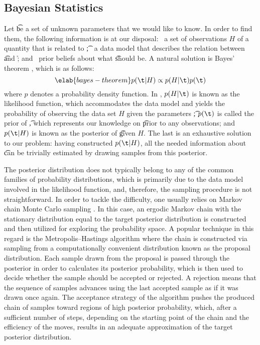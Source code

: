 \subsection{Bayesian Statistics}

Let \t be a set of unknown parameters that we would like to know. In order to
find them, the following information is at our disposal: \one~a set of
observations $H$ of a quantity \h that is related to \t; \two~a data model that
describes the relation between \t and \h; and \three~prior beliefs about what \t
should be. A natural solution is Bayes' theorem \cite{gelman2004}, which is as
follows:
\begin{equation} \elab{bayes-theorem}
  p(\t | H) \propto p(H | \t) p(\t)
\end{equation}
where $p$ denotes a probability density function. In , $p(H
| \t)$ is known as the likelihood function, which accommodates the data model
and yields the probability of observing the data set $H$ given the parameters
\t; $p(\t)$ is called the prior of \t, which represents our knowledge on \t
prior to any observations; and $p(\t | H)$ is known as the posterior of \t given
$H$. The last is an exhaustive solution to our problem: having constructed $p(\t
| H)$, all the needed information about \t can be trivially estimated by drawing
samples from this posterior.

The posterior distribution does not typically belong to any of the common
families of probability distributions, which is primarily due to the data model
involved in the likelihood function, and, therefore, the sampling procedure is
not straightforward. In order to tackle the difficulty, one usually relies on
Markov chain Monte Carlo sampling \cite{gelman2004}. In this case, an ergodic
Markov chain with the stationary distribution equal to the target posterior
distribution is constructed and then utilized for exploring the probability
space. A popular technique in this regard is the Metropolis--Hastings algorithm
where the chain is constructed via sampling from a computationally convenient
distribution known as the proposal distribution. Each sample drawn from the
proposal is passed through the posterior in order to calculates its posterior
probability, which is then used to decide whether the sample should be accepted
or rejected. A rejection means that the sequence of samples advances using the
last accepted sample as if it was drawn once again. The acceptance strategy of
the algorithm pushes the produced chain of samples toward regions of high
posterior probability, which, after a sufficient number of steps, depending on
the starting point of the chain and the efficiency of the moves, results in an
adequate approximation of the target posterior distribution.
